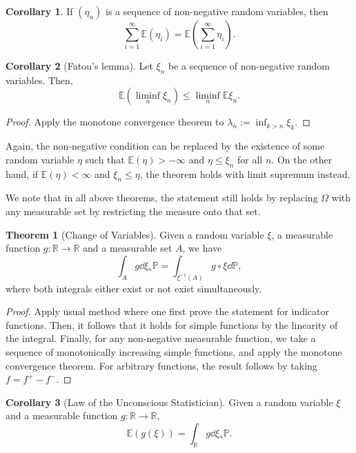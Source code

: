 \documentclass[]{article}
\theoremstyle{definition}
\newtheorem{theorem}{Theorem}
\newtheorem{corollary}{Corollary}[theorem]
\theoremstyle{definition}
\begin{document}
\begin{corollary}
  If \((\eta_n)\) is a sequence of non-negative random variables, then 
  \[\sum_{i = 1}^\infty \mathbb{E}(\eta_i) = \mathbb{E}\left(\sum_{i = 1}^\infty \eta_i\right).\]
\end{corollary}

\begin{corollary}[Fatou's lemma]
  Let \(\xi_n\) be a sequence of non-negative random variables. Then, 
  \[\mathbb{E}(\liminf_{n} \xi_n) \le \liminf_n \mathbb{E} \xi_n.\]
\end{corollary}
\begin{proof}
  Apply the monotone convergence theorem to \(\lambda_n := \inf_{k > n} \xi_k\).
\end{proof}

Again, the non-negative condition can be replaced by the existence of some random 
variable \(\eta\) such that \(\mathbb{E}(\eta) > -\infty\) and \(\eta \le \xi_n\)
for all \(n\). On the other hand, if \(\mathbb{E}(\eta) < \infty\) and \(\xi_n \le \eta\),
the theorem holds with limit supremum instead. 

We note that in all above theorems, the statement still holds by replacing \(\Omega\) 
with any measurable set by restricting the measure onto that set.

\begin{theorem}[Change of Variables]
  Given a random variable \(\xi\), a measurable function \(g : \mathbb{R} \to \mathbb{R}\) 
  and a measurable set \(A\), we have 
  \[\int_A g \dd \xi_* \mathbb{P} = \int_{\xi^{-1}(A)} g \circ \xi \dd \mathbb{P},\]
  where both integrals either exist or not exist simultaneously.
\end{theorem}
\begin{proof}
  Apply usual method where one first prove the statement for indicator functions. 
  Then, it follows that it holds for simple functions by the linearity of the 
  integral. Finally, for any non-negative measurable function, we take a sequence 
  of monotonically increasing simple functions, and apply the monotone convergence 
  theorem. For arbitrary functions, the result follows by taking \(f = f^+ - f^-\).
\end{proof}

\begin{corollary}[Law of the Unconscious Statistician]
  Given a random variable \(\xi\) and a measurable function \(g : \mathbb{R} \to \mathbb{R}\),
  \[\mathbb{E}(g(\xi)) = \int_{\mathbb{R}} g \dd \xi_* \mathbb{P}.\]
\end{corollary}
\end{document}
